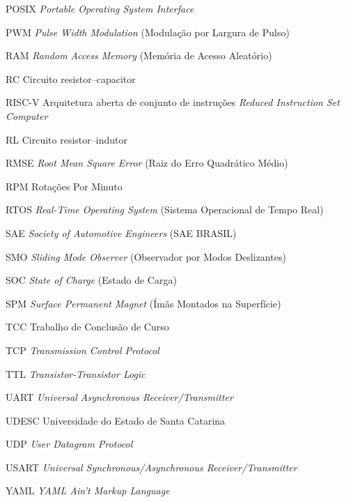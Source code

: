 \begin{siglas}
	\item[POSIX] \textit{Portable Operating System Interface}
	\item[PWM] \textit{Pulse Width Modulation} (Modulação por Largura de Pulso)
	\item[RAM] \textit{Random Access Memory} (Memória de Acesso Aleatório)
	\item[RC] Circuito resistor--capacitor
	\item[RISC-V] Arquitetura aberta de conjunto de instruções \textit{Reduced Instruction Set Computer}
	\item[RL] Circuito resistor--indutor
	\item[RMSE] \textit{Root Mean Square Error} (Raiz do Erro Quadrático Médio)
	\item[RPM] Rotações Por Minuto
	\item[RTOS] \textit{Real-Time Operating System} (Sistema Operacional de Tempo Real)
	\item[SAE] \textit{Society of Automotive Engineers} (SAE BRASIL)
	\item[SMO] \textit{Sliding Mode Observer} (Observador por Modos Deslizantes)
	\item[SOC] \textit{State of Charge} (Estado de Carga)
	\item[SPM] \textit{Surface Permanent Magnet} (Ímãs Montados na Superfície)
	\item[TCC] Trabalho de Conclusão de Curso
	\item[TCP] \textit{Transmission Control Protocol}
	\item[TTL] \textit{Transistor-Transistor Logic}
	\item[UART] \textit{Universal Asynchronous Receiver/Transmitter}
	\item[UDESC] Universidade do Estado de Santa Catarina
	\item[UDP] \textit{User Datagram Protocol}
	\item[USART] \textit{Universal Synchronous/Asynchronous Receiver/Transmitter}
	\item[YAML] \textit{YAML Ain't Markup Language}
\end{siglas}

